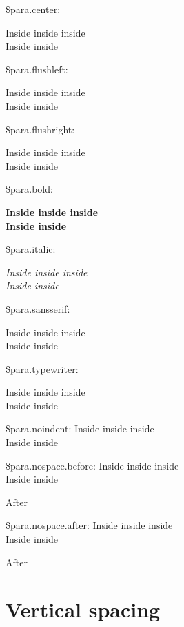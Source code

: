 \documentclass[demo]{pyscribe}
\begin{document}
\par\$para.center: \par{\centering
Inside inside inside \\ Inside inside\par}
\par\$para.flushleft: \par{\raggedright
Inside inside inside \\ Inside inside\par}
\par\$para.flushright: \par{\raggedleft
Inside inside inside \\ Inside inside\par}
\par\$para.bold: \par{\bfseries
Inside inside inside \\ Inside inside\par}
\par\$para.italic: \par{\itshape
Inside inside inside \\ Inside inside\par}
\par\$para.sansserif: \par{\sf
Inside inside inside \\ Inside inside\par}
\par\$para.typewriter: \par{\ttfamily
Inside inside inside \\ Inside inside\par}
\par\$para.noindent: \noindent Inside inside inside \\ Inside inside
\par\$para.nospace.before: \vspace{-\parskip}Inside inside inside \\ Inside inside\par After \par
\par\$para.nospace.after: \vspace{-\parskip}Inside inside inside \\ Inside inside\par After \par

\section{Vertical spacing}
\end{document}
